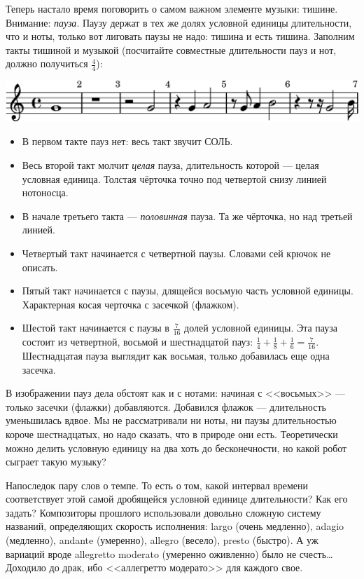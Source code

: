 Теперь настало время поговорить о самом важном элементе музыки: тишине. Внимание: \emph{пауза}. Паузу держат в тех же долях условной единицы длительности, что и ноты, только вот лиговать паузы не надо: тишина и есть тишина. Заполним такты тишиной и музыкой (посчитайте совместные длительности пауз и нот, должно получиться $\frac{4}{4}$): 
\begin{center}
    \includegraphics{fig/notes/pause}
\end{center}
\begin{itemize}
    \item В первом такте пауз нет: весь такт звучит СОЛЬ.
    \item Весь второй такт молчит \emph{целая} пауза, длительность которой --- целая условная единица. Толстая чёрточка точно под четвертой снизу линией нотоносца.
    \item В начале третьего такта --- \emph{половинная} пауза. Та же чёрточка, но над третьей линией.
    \item Четвертый такт начинается с четвертной паузы. Словами сей крючок не описать.
    \item Пятый такт начинается с паузы, длящейся восьмую часть условной единицы. Характерная косая черточка с засечкой (флажком).
    \item Шестой такт начинается с паузы в $\frac{7}{16}$ долей условной единицы. Эта пауза состоит из четвертной, восьмой и шестнадцатой пауз: $\frac{1}{4} + \frac{1}{8} + \frac{1}{6} = \frac{7}{16}$. Шестнадцатая пауза выглядит как восьмая, только добавилась еще одна засечка. 
\end{itemize}

В изображении пауз дела обстоят как и с нотами: начиная с <<восьмых>> --- только засечки (флажки) добавляются. Добавился флажок --- длительность уменьшилась вдвое. Мы не рассматривали ни ноты, ни паузы длительностью короче шестнадцатых, но надо сказать, что в природе они есть. Теоретически можно делить условную единицу на два хоть до бесконечности, но какой робот сыграет такую музыку?

Напоследок пару слов о темпе. То есть о том, какой интервал времени соответствует этой самой дробящейся условной единице длительности? Как его задать? Композиторы прошлого использовали довольно сложную систему названий, определяющих скорость исполнения: largo (очень медленно), adagio (медленно), andante (умеренно), allegro (весело), presto (быстро). А уж вариаций вроде allegretto moderato (умеренно оживленно) было не счесть\ldots Доходило до драк, ибо <<аллегретто модерато>> для каждого свое. 


